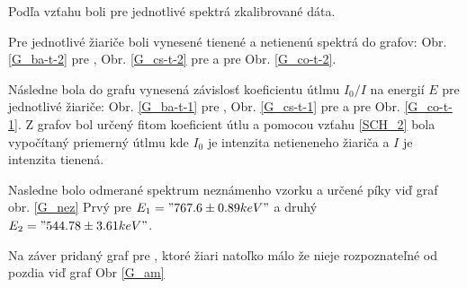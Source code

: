 Podľa vzťahu boli pre jednotlivé spektrá zkalibrované dáta.


Pre jednotlivé žiariče boli vynesené tienené a netienenú spektrá do grafov: 
Obr. \ref{G_ba-t-2} pre , 
Obr. \ref{G_cs-t-2} pre  
a pre  Obr. \ref{G_co-t-2}.

Následne bola do grafu vynesená závislosť koeficientu útlmu $I_0/I$ 
na energií $E$ pre jednotlivé žiariče: Obr. \ref{G_ba-t-1} pre , 
Obr. \ref{G_cs-t-1} pre  
a pre  Obr. \ref{G_co-t-1}.
Z grafov bol určený fitom koeficient útlu
a pomocou vzťahu \ref{SCH_2} bola vypočítaný priemerný útlmu
kde $I_0$ je intenzita netieneneho žiariča a $I$ je intenzita tienená.


Nasledne bolo odmerané spektrum neznámenho vzorku a určené píky viď graf obr. \ref{G_nez}
Prvý pre $E_1="767.6\pm0.89 keV"$ a druhý $E_2="544.78\pm3.61 keV"$. 


Na záver pridaný graf pre , ktoré žiari natoľko málo že nieje rozpoznateľné od pozdia viď graf Obr \ref{G_am}


